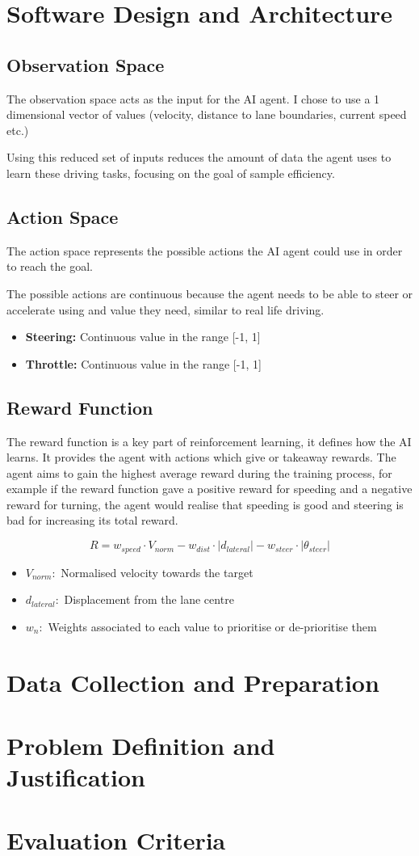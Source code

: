 \section{Software Design and Architecture}
\subsection{Observation Space}
The observation space acts as the input for the AI agent. I chose to use a 1 dimensional vector of values (velocity, distance to lane boundaries, current speed etc.)

Using this reduced set of inputs reduces the amount of data the agent uses to learn these driving tasks, focusing on the goal of sample efficiency.

\subsection{Action Space}
The action space represents the possible actions the AI agent could use in order to reach the goal.

The possible actions are continuous because the agent needs to be able to steer or accelerate using and value they need, similar to real life driving.

\begin{itemize}
    \item \textbf{Steering:} Continuous value in the range [-1, 1]
    \item \textbf{Throttle:} Continuous value in the range [-1, 1]
\end{itemize}


\subsection{Reward Function}
The reward function is a key part of reinforcement learning, it defines how the AI learns. It provides the agent with actions which give or takeaway rewards. The agent aims to gain the highest average reward during the training process, for example if the reward function gave a positive reward for speeding and a negative reward for turning, the agent would realise that speeding is good and steering is bad for increasing its total reward.

$$R = w_{speed} \cdot V_{norm} - w_{dist} \cdot |d_{lateral}| - w_{steer} \cdot |\theta_{steer}|$$

\begin{itemize}
    \item \textbf{$V_{norm}:$} Normalised velocity towards the target
    \item \textbf{$d_{lateral}:$} Displacement from the lane centre
    \item \textbf{$w_n:$} Weights associated to each value to prioritise or de-prioritise them
\end{itemize}

\section{Data Collection and Preparation}

\section{Problem Definition and Justification}

\section{Evaluation Criteria}
